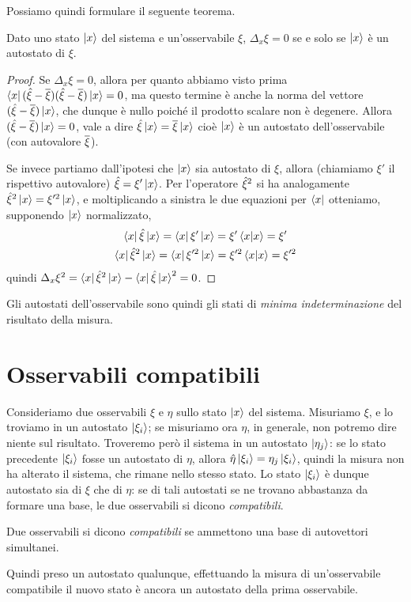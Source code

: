 Possiamo quindi formulare il seguente teorema.
\begin{teorema} \label{t:autostato-indeterminazione-nulla}
	Dato uno stato $\left|{x}\right\rangle$ del sistema e un'osservabile $\xi$, $\Delta_x\xi=0$ se e solo se $\left|{x}\right\rangle$ è un autostato di $\xi$.
\end{teorema}
\begin{proof}
	Se $\Delta_x\xi=0$, allora per quanto abbiamo visto prima $\left\langle{x}\right|(\hat{\xi}-\overline{\xi})(\hat{\xi}-\overline{\xi})\left|{x}\right\rangle=0$, ma questo termine è anche la norma del vettore $(\hat{\xi}-\overline{\xi})\left|{x}\right\rangle$, che dunque è nullo poich\'e il prodotto scalare non è degenere.
	Allora $(\hat{\xi}-\overline{\xi})\left|{x}\right\rangle=0$, vale a dire $\hat{\xi}\left|{x}\right\rangle=\overline{\xi}\left|{x}\right\rangle$ cioè $\left|{x}\right\rangle$ è un autostato dell'osservabile (con autovalore $\overline{\xi}$).

	Se invece partiamo dall'ipotesi che $\left|{x}\right\rangle$ sia autostato di $\xi$, allora (chiamiamo $\xi'$ il rispettivo autovalore) $\hat{\xi}=\xi'\left|{x}\right\rangle$.
	Per l'operatore $\hat{\xi}^2$ si ha analogamente $\hat{\xi}^2\left|{x}\right\rangle=\xi'^2\left|{x}\right\rangle$, e moltiplicando a sinistra le due equazioni per $\left\langle{x}\right|$ otteniamo, supponendo $\left|{x}\right\rangle$ normalizzato,
	\begin{gather}
		\left\langle{x}\right|\hat{\xi}\left|{x}\right\rangle=\left\langle{x}\right|\xi'\left|{x}\right\rangle=\xi'\left\langle{x}\middle|{x}\right\rangle=\xi'\\
		\left\langle{x}\right|\hat{\xi}^2\left|{x}\right\rangle=\left\langle{x}\right|\xi'^2\left|{x}\right\rangle=\xi'^2\left\langle{x}\middle|{x}\right\rangle=\xi'^2
	\end{gather}
	quindi $\Delta_x\xi^2=\left\langle{x}\right|\hat{\xi}^2\left|{x}\right\rangle-\left\langle{x}\right|\hat{\xi}\left|{x}\right\rangle^2=0$.
\end{proof}
Gli autostati dell'osservabile sono quindi gli stati di \emph{minima indeterminazione} del risultato della misura.

\section{Osservabili compatibili}
Consideriamo due osservabili $\xi$ e $\eta$ sullo stato $\left|{x}\right\rangle$ del sistema.
Misuriamo $\xi$, e lo troviamo in un autostato $\left|{\xi_i}\right\rangle$; se misuriamo ora $\eta$, in generale, non potremo dire niente sul risultato.
Troveremo però il sistema in un autostato $\left|{\eta_j}\right\rangle$: se lo stato precedente $\left|{\xi_i}\right\rangle$ fosse un autostato di $\eta$, allora $\hat{\eta}\left|{\xi_i}\right\rangle=\eta_j\left|{\xi_i}\right\rangle$, quindi la misura non ha alterato il sistema, che rimane nello stesso stato.
Lo stato $\left|{\xi_i}\right\rangle$ è dunque autostato sia di $\xi$ che di $\eta$: se di tali autostati se ne trovano abbastanza da formare una base, le due osservabili si dicono \emph{compatibili}.
\begin{definizione} \label{d:osservabili-compatibili}
	Due osservabili si dicono \emph{compatibili} se ammettono una base di autovettori simultanei.
\end{definizione}
Quindi preso un autostato qualunque, effettuando la misura di un'osservabile compatibile il nuovo stato è ancora un autostato della prima osservabile.

